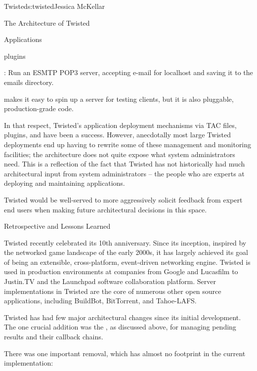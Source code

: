\begin{aosachapter}{Twisted}{s:twisted}{Jessica McKellar}
\begin{aosasect1}{The Architecture of Twisted}
\begin{aosasect2}{Applications}
\begin{aosasect3}{plugins}
\begin{aosaitemize}
\item {}: Run an
  ESMTP POP3 server, accepting e-mail for localhost and saving it to
  the emails directory.

\end{aosaitemize}

 makes it easy to spin up a server for testing clients,
but it is also pluggable, production-grade code.

In that respect, Twisted's application deployment mechanisms via TAC files,
plugins, and  have been a success. However, anecdotally most
large Twisted deployments end up having to rewrite some of these management and
monitoring facilities; the architecture does not quite expose what system
administrators need. This is a reflection of the fact that Twisted has not
historically had much architectural input from system administrators -- the
people who are experts at deploying and maintaining applications.

Twisted would be well-served to more aggressively solicit feedback from
expert end users when making future architectural decisions in this space.

\end{aosasect3}

\end{aosasect2}

\end{aosasect1}

\begin{aosasect1}{Retrospective and Lessons Learned}

Twisted recently celebrated its 10th anniversary. Since its inception,
inspired by the networked game landscape of the early 2000s, it has largely
achieved its goal of being an extensible, cross-platform, event-driven
networking engine. Twisted is used in production environments at companies from
Google and Lucasfilm to Justin.TV and the Launchpad software collaboration
platform. Server implementations in Twisted are the core of numerous other open
source applications, including BuildBot, BitTorrent, and Tahoe-LAFS.

Twisted has had few major architectural changes since its initial
development. The one crucial addition was the , as
discussed above, for managing pending results and their callback chains.

There was one important removal, which has almost no footprint in the current
implementation:


\end{aosasect1}
\end{aosachapter}
